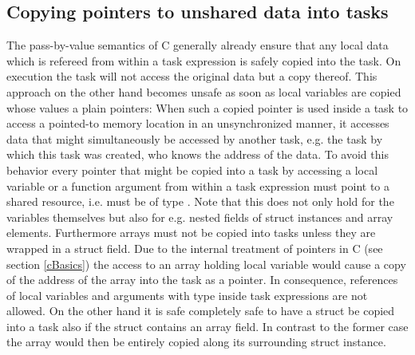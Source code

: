 \subsection{Copying pointers to unshared data into tasks}
The pass-by-value semantics of C generally already ensure that any local data which is refereed from within a task expression is safely copied into the task. On execution the task will not access the original data but a copy thereof. This approach on the other hand becomes unsafe as soon as local variables are copied whose values a plain pointers: When such a copied pointer is used inside a task to access a pointed-to memory location in an unsynchronized manner, it accesses data that might simultaneously be accessed by another task, e.g. the task by which this task was created, who knows the address of the data. To avoid this behavior every pointer that might be copied into a task by accessing a local variable or a function argument from within a task expression must point to a shared resource, i.e. must be of type . Note that this does not only hold for the variables themselves but also for e.g. nested fields of struct instances and array elements. Furthermore arrays must not be copied into tasks unless they are wrapped in a struct field. Due to the internal treatment of pointers in C (see section \ref{cBasics}) the access to an array holding local variable would cause a copy of the address of the array into the task as a pointer. In consequence, references of local variables and arguments with type  inside task expressions are not allowed. On the other hand it is safe completely safe to have a struct be copied into a task also if the struct contains an array field. In contrast to the former case the array would then be entirely copied along its surrounding struct instance.

